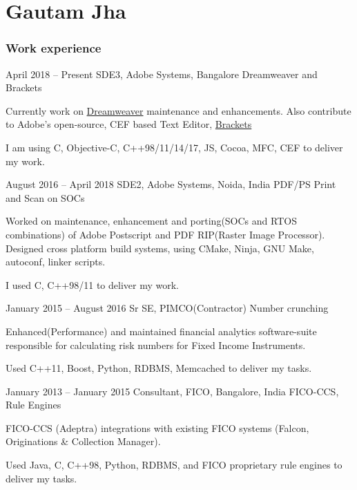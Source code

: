 \part{Gautam Jha}

\section{Work experience}

\begin{eventlist}

\item{April 2018 -- Present}
     {SDE3, Adobe Systems, Bangalore}
     {Dreamweaver and Brackets}
     
Currently work on \href{https://www.adobe.com/in/products/dreamweaver.html}{Dreamweaver} maintenance and enhancements. Also contribute to Adobe's open-source, CEF based Text Editor, \href{https://github.com/adobe/brackets}{Brackets}

I am using C, Objective-C, C++98/11/14/17, JS, Cocoa, MFC, CEF to deliver my work.

\item{August 2016 -- April 2018}
     {SDE2, Adobe Systems, Noida, India}
     {PDF/PS Print and Scan on SOCs}

Worked on maintenance, enhancement and porting(SOCs and RTOS combinations) of Adobe Postscript and PDF RIP(Raster Image Processor).
Designed cross platform build systems, using CMake, Ninja, GNU Make, autoconf, linker scripts.

I used C, C++98/11 to deliver my work.

\item{January 2015 -- August 2016}
     {Sr SE, PIMCO(Contractor)}
     {Number crunching}

Enhanced(Performance) and maintained financial analytics software-suite responsible for calculating risk numbers for Fixed Income Instruments. 

Used C++11, Boost, Python, RDBMS, Memcached to deliver my tasks.

\item{January 2013 -- January 2015}
     {Consultant, FICO, Bangalore, India}
     {FICO-CCS, Rule Engines}

FICO-CCS (Adeptra) integrations with existing FICO systems (Falcon, Originations \& Collection Manager).

Used Java, C, C++98, Python, RDBMS, and FICO proprietary rule engines to deliver my tasks.
\end{eventlist}

